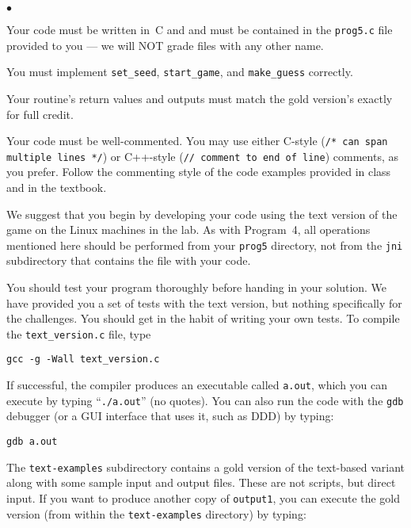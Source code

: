 \begin{list}{$\bullet$}{\setlength{\itemsep}{0pt}\setlength{\parskip}{0pt}%
\setlength{\topsep}{0pt}\setlength{\partopsep}{0pt}\setlength{\parsep}{0pt}}
\item{Your code must be written in~C and
and must be contained in the {\tt prog5.c} file provided to you --- 
we will NOT grade files with any other name.}
\item{You must implement {\tt set\_seed}, {\tt start\_game}, and 
{\tt make\_guess} correctly.}
\item{Your routine's return values and outputs must match the gold version's 
exactly for full credit.}
\item{Your code must be well-commented.  You may use either \mbox{C-style}
({\tt /* can span multiple lines */}) or \mbox{C++-style}
({\tt // comment to end of line}) comments, as you prefer.
Follow the commenting style of 
the code examples provided in class and in the textbook. }
\end{list}\vspace{12pt}



We suggest that you begin by developing your code using the text version
of the game on the Linux machines
in the lab.
As with Program~4, all operations mentioned here should be performed from 
your {\tt prog5}
directory, not from the {\tt jni} subdirectory that contains the file
with your code.

You should test your program thoroughly before handing in your solution.
We have provided you a set of tests with the text version, but nothing
specifically for the challenges.
You should get in the habit of writing your own tests.
%
To compile the {\tt text\_version.c} file, type

\protect{\mbox{\hspace{.25in}}}%
{\tt gcc -g -Wall text\_version.c}

If successful, the compiler produces an executable called {\tt a.out},
which you can execute by typing ``{\tt ./a.out}'' (no quotes).
%
You can also run the code with the {\tt gdb} debugger (or a GUI interface
that uses it, such as DDD) by typing:

\protect{\mbox{\hspace{.25in}}}%
{\tt gdb a.out}

The {\tt text-examples} subdirectory contains a gold version of the
text-based variant along with some sample input and output files.
These are not scripts, but direct input.  If you want to produce another
copy of {\tt output1}, you can execute the gold version (from within
the {\tt text-examples} directory) by typing:

